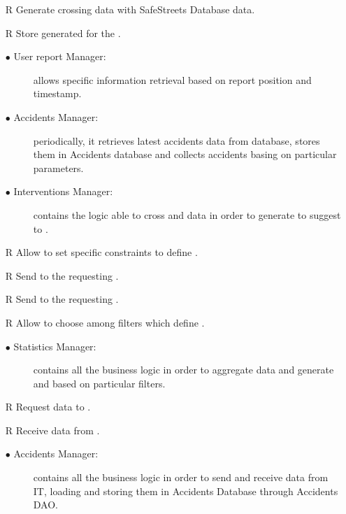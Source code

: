 \documentclass[../DD.tex]{subfiles}
\begin{document}
\begin{itemize}
	\item[R\subs{16}]Generate  crossing   data with SafeStreets Database data.
	\item[R\subs{17}]Store generated  for the .
	\begin{description}
	\item[$\bullet$ User report Manager:] allows specific  information retrieval based on report position and timestamp.
	\item[$\bullet$ Accidents Manager:] periodically, it retrieves latest accidents data from  database, stores them in Accidents database and collects accidents basing on particular parameters.
	\item[$\bullet$ Interventions Manager:] contains the logic able to cross  and  data in order to generate  to suggest to .
	\end{description}
	
	\item[R\subs{18}]Allow  to set specific constraints to define .
	\item[R\subs{19}]Send  to the requesting .
	\item[R\subs{24}]Send  to the requesting .
	\item[R\subs{23}]Allow  to choose among filters which define .
	\begin{description}
	\item[$\bullet$ Statistics Manager:] contains all the business logic in order to aggregate  data and generate  and   based on particular filters.
	\end{description}
	
	\item[R\subs{27}]Request  data to .
	\item[R\subs{28}]Receive  data from .
	\begin{description}
	\item[$\bullet$ Accidents Manager:] contains all the business logic in order to send and receive  data from  IT, loading and storing them in Accidents Database through Accidents DAO.
	\end{description}

\end{itemize}
\end{document}
